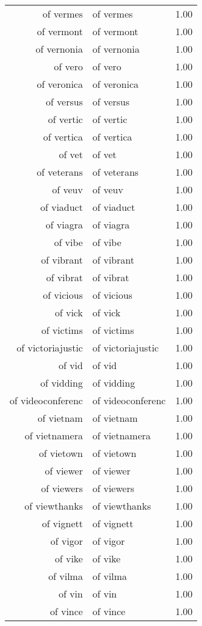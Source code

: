 \begin{table}[ht]
\begin{tabular}{rlr}
  of vermes & of vermes & 1.00 \\ 
  of vermont & of vermont & 1.00 \\ 
  of vernonia & of vernonia & 1.00 \\ 
  of vero & of vero & 1.00 \\ 
  of veronica & of veronica & 1.00 \\ 
  of versus & of versus & 1.00 \\ 
  of vertic & of vertic & 1.00 \\ 
  of vertica & of vertica & 1.00 \\ 
  of vet & of vet & 1.00 \\ 
  of veterans & of veterans & 1.00 \\ 
  of veuv & of veuv & 1.00 \\ 
  of viaduct & of viaduct & 1.00 \\ 
  of viagra & of viagra & 1.00 \\ 
  of vibe & of vibe & 1.00 \\ 
  of vibrant & of vibrant & 1.00 \\ 
  of vibrat & of vibrat & 1.00 \\ 
  of vicious & of vicious & 1.00 \\ 
  of vick & of vick & 1.00 \\ 
  of victims & of victims & 1.00 \\ 
  of victoriajustic & of victoriajustic & 1.00 \\ 
  of vid & of vid & 1.00 \\ 
  of vidding & of vidding & 1.00 \\ 
  of videoconferenc & of videoconferenc & 1.00 \\ 
  of vietnam & of vietnam & 1.00 \\ 
  of vietnamera & of vietnamera & 1.00 \\ 
  of vietown & of vietown & 1.00 \\ 
  of viewer & of viewer & 1.00 \\ 
  of viewers & of viewers & 1.00 \\ 
  of viewthanks & of viewthanks & 1.00 \\ 
  of vignett & of vignett & 1.00 \\ 
  of vigor & of vigor & 1.00 \\ 
  of vike & of vike & 1.00 \\ 
  of vilma & of vilma & 1.00 \\ 
  of vin & of vin & 1.00 \\ 
  of vince & of vince & 1.00 \\ 

\end{tabular}
\end{table}
